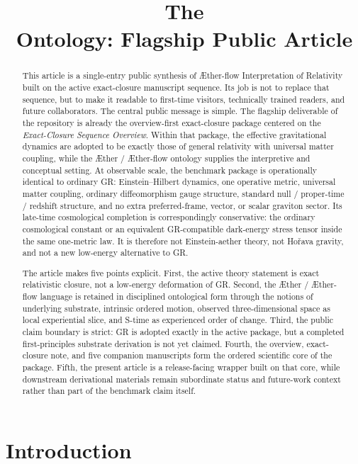 \documentclass[11pt]{article}
\title{The \TheoryName{}\\[0.4em]
Ontology: Flagship Public Article}
\author{}
\date{}
\newcommand{\Aether}{\AE{}ther}
\newcommand{\Aflow}{\AE{}ther-flow}
\newcommand{\TheoryName}{\Aflow{} Interpretation of Relativity}
\begin{document}
\AetherFlowAPATitlePage

\begin{abstract}
This article is a single-entry public synthesis of \TheoryName{} built on the active exact-closure manuscript sequence. Its job is not to replace that sequence, but to make it readable to first-time visitors, technically trained readers, and future collaborators. The central public message is simple. The flagship deliverable of the repository is already the overview-first exact-closure package centered on the \emph{Exact-Closure Sequence Overview}. Within that package, the effective gravitational dynamics are adopted to be exactly those of general relativity with universal matter coupling, while the \Aether{} / \Aflow{} ontology supplies the interpretive and conceptual setting. At observable scale, the benchmark package is operationally identical to ordinary GR: Einstein--Hilbert dynamics, one operative metric, universal matter coupling, ordinary diffeomorphism gauge structure, standard null / proper-time / redshift structure, and no extra preferred-frame, vector, or scalar graviton sector. Its late-time cosmological completion is correspondingly conservative: the ordinary cosmological constant or an equivalent GR-compatible dark-energy stress tensor inside the same one-metric law. It is therefore not Einstein-aether theory, not Ho\v{r}ava gravity, and not a new low-energy alternative to GR.

The article makes five points explicit. First, the active theory statement is exact relativistic closure, not a low-energy deformation of GR. Second, the \Aether{} / \Aflow{} language is retained in disciplined ontological form through the notions of underlying substrate, intrinsic ordered motion, observed three-dimensional space as local experiential slice, and S-time as experienced order of change. Third, the public claim boundary is strict: GR is adopted exactly in the active package, but a completed first-principles substrate derivation is not yet claimed. Fourth, the overview, exact-closure note, and five companion manuscripts form the ordered scientific core of the package. Fifth, the present article is a release-facing wrapper built on that core, while downstream derivational materials remain subordinate status and future-work context rather than part of the benchmark claim itself.
\end{abstract}

\section{Introduction}
\end{document}
